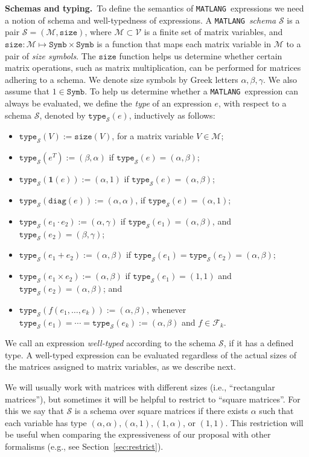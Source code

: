 \documentclass[sigconf]{acmart}
\newcommand{\Mnam}{\mathcal{M}}
\newcommand{\Mvar}{\mathcal{V}}
\newcommand{\Fun}{\mathcal{F}}
\newcommand{\ones}{\mathbf{1}}
\newcommand{\diag}{\texttt{diag}}
\newcommand{\Sch}{\mathcal{S}}
\newcommand{\DD}{\texttt{Symb}}
\newcommand{\size}{\texttt{size}}
\newcommand{\ttype}{\texttt{type}_{\Sch}}
\newcommand{\lang}{\texttt{MATLANG}\xspace}
\begin{document}
\smallskip
\noindent
\textbf{Schemas and typing.}\,
To define the semantics of \lang\ expressions we need a notion of schema and well-typedness of expressions. A \lang\ \textit{schema} $\Sch$ is a pair $\Sch=(\Mnam,\size)$, where $\Mnam\subset \Mvar$ is a finite set of matrix variables, and $\size: \Mnam \mapsto \DD\times \DD$ is a function that maps each matrix variable in $\Mnam$ to a pair of \textit{size symbols}. The $\size$ function helps us determine whether certain matrix operations, such as matrix multiplication, can be performed for matrices adhering to a schema. 
We denote size symbols by Greek letters $\alpha,\beta,\gamma$. We also assume that $1\in \DD$. 
To help us determine whether a \lang\ expression can always be evaluated, we define the \textit{type} of an expression $e$, with respect to a schema $\Sch$, denoted by $\ttype(e)$, inductively as follows:
\begin{itemize}
\item $\ttype(V):= \size(V)$, for a matrix variable $V\in\Mnam$;
\item $\ttype(e^T):= (\beta,\alpha)$ if $\ttype(e)=(\alpha,\beta)$;
\item $\ttype(\ones(e)):= (\alpha,1)$ if $\ttype(e)=(\alpha,\beta)$;
\item $\ttype(\diag(e)):= (\alpha,\alpha)$, if $\ttype(e)=(\alpha,1)$;
\item $\ttype(e_1 \cdot e_2):= (\alpha,\gamma)$ if  $\ttype(e_1)=(\alpha,\beta)$, and $\ttype(e_2)=(\beta,\gamma)$;
\item $\ttype(e_1 + e_2):=(\alpha,\beta)$ if $\ttype(e_1)=\ttype(e_2)=(\alpha,\beta)$;
\item $\ttype(e_1\times e_2):=(\alpha,\beta)$ if $\ttype(e_1)=(1,1)$ and $\ttype(e_2)=(\alpha,\beta)$; and
\item $\ttype(f(e_1,\ldots ,e_k)):= (\alpha,\beta)$, whenever $\ttype(e_1) = \cdots = \ttype(e_k) := (\alpha,\beta)$ and $f\in\Fun_k$.
\end{itemize}
We call an expression \textit{well-typed} according to the schema $\Sch$, if it has a defined type. 
A well-typed expression can be evaluated regardless of the actual sizes of the matrices assigned to matrix variables, as we describe next.

We will usually work with matrices with different sizes (i.e., ``rectangular matrices''), but sometimes it will be helpful to restrict to ``square matrices''. For this we say that $\Sch$ is a schema over square matrices if there exists $\alpha$ such that each variable has type $(\alpha,\alpha),(\alpha,1),(1,\alpha)$, or $(1,1)$. This restriction will be useful when comparing the expressiveness of our proposal with other formalisms (e.g., see Section~\ref{sec:restrict}). 
\end{document}
